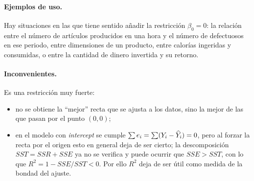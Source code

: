 \paragraph{Ejemplos de uso.} Hay situaciones en las que tiene sentido añadir la restricción
$\beta_0=0$: la relación entre el número de artículos producidos en una hora y el número de
defectuosos en ese periodo, entre dimensiones de un producto, entre calorías ingeridas y
consumidas, o entre la cantidad de dinero invertida y su retorno.

\paragraph{Inconvenientes.} Es una restricción muy fuerte:
\begin{itemize}
  \item no se obtiene la ``mejor'' recta que se ajusta a los datos, sino la mejor de las que
    pasan por el punto $(0,0)$;
  \item en el modelo con \emph{intercept} se cumple $\sum e_i=\sum(Y_i-\widehat{Y}_i)=0$, pero al forzar la
    recta por el origen esto en general deja de ser cierto; la descomposición
    $SST=SSR+SSE$ ya no se verifica y puede ocurrir que $SSE>SST$, con lo que
    $R^2=1-SSE/SST<0$. Por ello $R^2$ deja de ser útil como medida de la bondad del ajuste.
\end{itemize}
